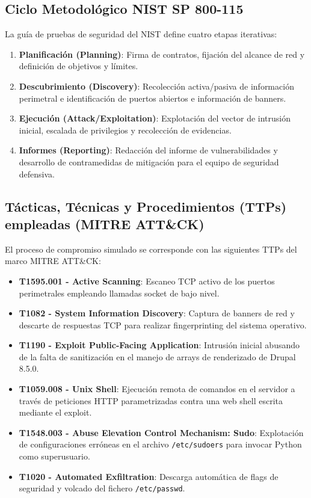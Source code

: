\documentclass[11pt,a4paper]{article}
\begin{document}
\subsection{Ciclo Metodológico NIST SP 800-115}
La guía de pruebas de seguridad del NIST define cuatro etapas iterativas:
\begin{enumerate}
    \item \textbf{Planificación (Planning)}: Firma de contratos, fijación del alcance de red y definición de objetivos y límites.
    \item \textbf{Descubrimiento (Discovery)}: Recolección activa/pasiva de información perimetral e identificación de puertos abiertos e información de banners.
    \item \textbf{Ejecución (Attack/Exploitation)}: Explotación del vector de intrusión inicial, escalada de privilegios y recolección de evidencias.
    \item \textbf{Informes (Reporting)}: Redacción del informe de vulnerabilidades y desarrollo de contramedidas de mitigación para el equipo de seguridad defensiva.
\end{enumerate}

\subsection{Tácticas, Técnicas y Procedimientos (TTPs) empleadas (MITRE ATT\&CK)}
El proceso de compromiso simulado se corresponde con las siguientes TTPs del marco MITRE ATT\&CK:
\begin{itemize}
    \item \textbf{T1595.001 - Active Scanning}: Escaneo TCP activo de los puertos perimetrales empleando llamadas socket de bajo nivel.
    \item \textbf{T1082 - System Information Discovery}: Captura de banners de red y descarte de respuestas TCP para realizar fingerprinting del sistema operativo.
    \item \textbf{T1190 - Exploit Public-Facing Application}: Intrusión inicial abusando de la falta de sanitización en el manejo de arrays de renderizado de Drupal 8.5.0.
    \item \textbf{T1059.008 - Unix Shell}: Ejecución remota de comandos en el servidor a través de peticiones HTTP parametrizadas contra una web shell escrita mediante el exploit.
    \item \textbf{T1548.003 - Abuse Elevation Control Mechanism: Sudo}: Explotación de configuraciones erróneas en el archivo \texttt{/etc/sudoers} para invocar Python como superusuario.
    \item \textbf{T1020 - Automated Exfiltration}: Descarga automática de flags de seguridad y volcado del fichero \texttt{/etc/passwd}.
\end{itemize}
\end{document}
